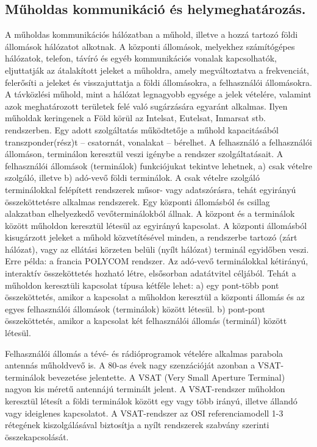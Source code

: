\subsection{Műholdas kommunikáció és helymeghatározás.}
A műholdas kommunikációs hálózatban a műhold, illetve a hozzá tartozó földi
állomások hálózatot alkotnak. A központi állomások, melyekhez számítógépes
hálózatok, telefon, távíró és egyéb kommunikációs vonalak kapcsolhatók,
eljuttatják az átalakított jeleket a műholdra, amely megváltoztatva a frekvenciát, felerősíti a jeleket és visszajuttatja a földi állomásokra, a felhasználói állomásokra. A távközlési műhold, mint a hálózat legnagyobb egysége a jelek vételére, valamint azok meghatározott területek felé való sugárzására egyaránt alkalmas. Ilyen műholdak keringenek a Föld körül az Intelsat, Eutelsat, Inmarsat stb. rendszerben. Egy adott szolgáltatás működtetője a műhold kapacitásából transzponder(rész)t -- csatornát, vonalakat -- bérelhet. A felhasználó a felhasználói állomáson, terminálon keresztül veszi igénybe a rendszer szolgáltatásait. A felhasználói állomások (terminálok) funkciójukat tekintve lehetnek, a) csak vételre szolgáló, illetve b) adó-vevő földi terminálok. A csak vételre szolgáló terminálokkal felépített rendszerek műsor- vagy adatszórásra, tehát egyirányú összeköttetésre alkalmas rendszerek. Egy központi állomásból és csillag alakzatban elhelyezkedő vevőterminálokból állnak. A központ és a terminálok között műholdon keresztül létesül az egyirányú
kapcsolat. A központi állomásból kisugárzott jeleket a műhold közvetítésével
minden, a rendszerbe tartozó (zárt hálózat), vagy az ellátási körzeten belüli
(nyílt hálózat) terminál egyidőben veszi. Erre példa: a francia POLYCOM
rendszer. Az adó-vevő terminálokkal kétirányú, interaktív összeköttetés hozható létre, elsősorban adatátvitel céljából. Tehát a műholdon keresztüli kapcsolat típusa kétféle lehet:
a) egy pont-több pont összeköttetés, amikor a kapcsolat a műholdon keresztül a
központi állomás és az egyes felhasználói állomások (terminálok) között létesül.
b) pont-pont összeköttetés, amikor a kapcsolat két felhasználói állomás (terminál) között létesül.

Felhasználói állomás a tévé- és rádióprogramok vételére alkalmas parabola
antennás műholdvevő is. A 80-as évek nagy szenzációját azonban a VSAT-
terminálok bevezetése jelentette. A VSAT (Very Small Aperture Terminal) nagyon kis méretű antennájú terminált jelent.
A VSAT-rendszer műholdon keresztül létesít a földi terminálok között egy vagy
több irányú, illetve állandó vagy ideiglenes kapcsolatot. A VSAT-rendszer az
OSI referenciamodell 1-3 rétegének kiszolgálásával biztosítja a nyílt rendszerek
szabvány szerinti összekapcsolását.

